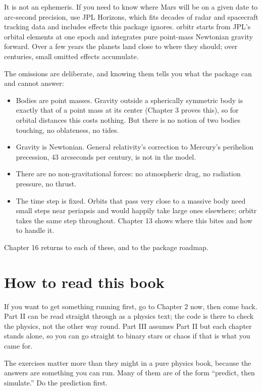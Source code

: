 \documentclass[
  10.5pt,
  letterpaper,
]{scrbook}
\providecommand{\tightlist}{%
  \setlength{\itemsep}{0pt}\setlength{\parskip}{0pt}}
\theoremstyle{definition}
\theoremstyle{plain}
\theoremstyle{remark}
\begin{document}
It is not an ephemeris. If you need to know where Mars will be on a
given date to arc-second precision, use JPL Horizons, which fits decades
of radar and spacecraft tracking data and includes effects this package
ignores. orbitr starts from JPL's orbital elements at one epoch and
integrates pure point-mass Newtonian gravity forward. Over a few years
the planets land close to where they should; over centuries, small
omitted effects accumulate.

The omissions are deliberate, and knowing them tells you what the
package can and cannot answer:

\begin{itemize}
\tightlist
\item
  Bodies are point masses. Gravity outside a spherically symmetric body
  is exactly that of a point mass at its center (Chapter 3 proves this),
  so for orbital distances this costs nothing. But there is no notion of
  two bodies touching, no oblateness, no tides.
\item
  Gravity is Newtonian. General relativity's correction to Mercury's
  perihelion precession, 43 arcseconds per century, is not in the model.
\item
  There are no non-gravitational forces: no atmospheric drag, no
  radiation pressure, no thrust.
\item
  The time step is fixed. Orbits that pass very close to a massive body
  need small steps near periapsis and would happily take large ones
  elsewhere; orbitr takes the same step throughout. Chapter 13 shows
  where this bites and how to handle it.
\end{itemize}

Chapter 16 returns to each of these, and to the package roadmap.

\section{How to read this book}\label{how-to-read-this-book}

If you want to get something running first, go to Chapter 2 now, then
come back. Part II can be read straight through as a physics text; the
code is there to check the physics, not the other way round. Part III
assumes Part II but each chapter stands alone, so you can go straight to
binary stars or chaos if that is what you came for.

The exercises matter more than they might in a pure physics book,
because the answers are something you can run. Many of them are of the
form ``predict, then simulate.'' Do the prediction first.
\end{document}
